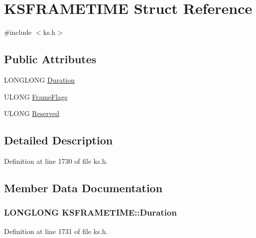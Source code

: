 \hypertarget{struct_k_s_f_r_a_m_e_t_i_m_e}{}\section{K\+S\+F\+R\+A\+M\+E\+T\+I\+ME Struct Reference}
\label{struct_k_s_f_r_a_m_e_t_i_m_e}


{\ttfamily \#include $<$ks.\+h$>$}

\subsection*{Public Attributes}
\begin{DoxyCompactItemize}
\item 
L\+O\+N\+G\+L\+O\+NG \hyperlink{struct_k_s_f_r_a_m_e_t_i_m_e_a3df3972b4e57add2aa12064ae960cc16}{Duration}
\item 
U\+L\+O\+NG \hyperlink{struct_k_s_f_r_a_m_e_t_i_m_e_a49e9bf0ab7597ae51918d48103b39fb9}{Frame\+Flags}
\item 
U\+L\+O\+NG \hyperlink{struct_k_s_f_r_a_m_e_t_i_m_e_a582071b07f756a21ae3bf04475ea1c8e}{Reserved}
\end{DoxyCompactItemize}


\subsection{Detailed Description}


Definition at line 1730 of file ks.\+h.



\subsection{Member Data Documentation}
\subsubsection[{\texorpdfstring{Duration}{Duration}}]{\setlength{\rightskip}{0pt plus 5cm}L\+O\+N\+G\+L\+O\+NG K\+S\+F\+R\+A\+M\+E\+T\+I\+M\+E\+::\+Duration}\hypertarget{struct_k_s_f_r_a_m_e_t_i_m_e_a3df3972b4e57add2aa12064ae960cc16}{}\label{struct_k_s_f_r_a_m_e_t_i_m_e_a3df3972b4e57add2aa12064ae960cc16}


Definition at line 1731 of file ks.\+h.

